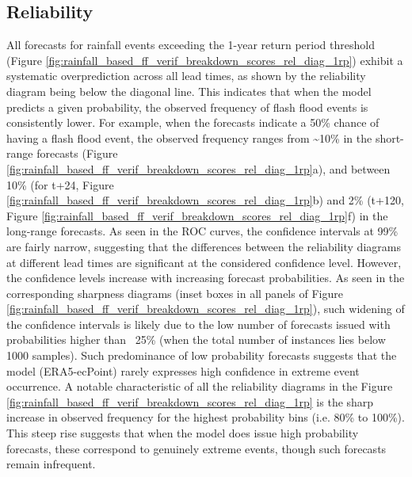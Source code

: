 \subsection{Reliability}

All forecasts for rainfall events exceeding the 1-year return period threshold (Figure \ref{fig:rainfall_based_ff_verif_breakdown_scores_rel_diag_1rp}) exhibit a systematic overprediction across all lead times, as shown by the reliability diagram being below the diagonal line. This indicates that when the model predicts a given probability, the observed frequency of flash flood events is consistently lower. For example, when the forecasts indicate a 50\% chance of having a flash flood event, the observed frequency ranges from \sim10\% in the short-range forecasts (Figure \ref{fig:rainfall_based_ff_verif_breakdown_scores_rel_diag_1rp}a), and between 10\% (for t+24, Figure \ref{fig:rainfall_based_ff_verif_breakdown_scores_rel_diag_1rp}b) and 2\% (t+120, Figure \ref{fig:rainfall_based_ff_verif_breakdown_scores_rel_diag_1rp}f) in the long-range forecasts. As seen in the ROC curves, the confidence intervals at 99\% are fairly narrow, suggesting that the differences between the reliability diagrams at different lead times are significant at the considered confidence level. However, the confidence levels increase with increasing forecast probabilities. As seen in the corresponding sharpness diagrams (inset boxes in all panels of Figure \ref{fig:rainfall_based_ff_verif_breakdown_scores_rel_diag_1rp}), such widening of the confidence intervals is likely due to the low number of forecasts issued with probabilities higher than ~25\% (when the total number of instances lies below 1000 samples). Such predominance of low probability forecasts suggests that the model (ERA5-ecPoint) rarely expresses high confidence in extreme event occurrence. A notable characteristic of all the reliability diagrams in the Figure \ref{fig:rainfall_based_ff_verif_breakdown_scores_rel_diag_1rp} is the sharp increase in observed frequency for the highest probability bins (i.e. 80\% to 100\%). This steep rise suggests that when the model does issue high probability forecasts, these correspond to genuinely extreme events, though such forecasts remain infrequent.

